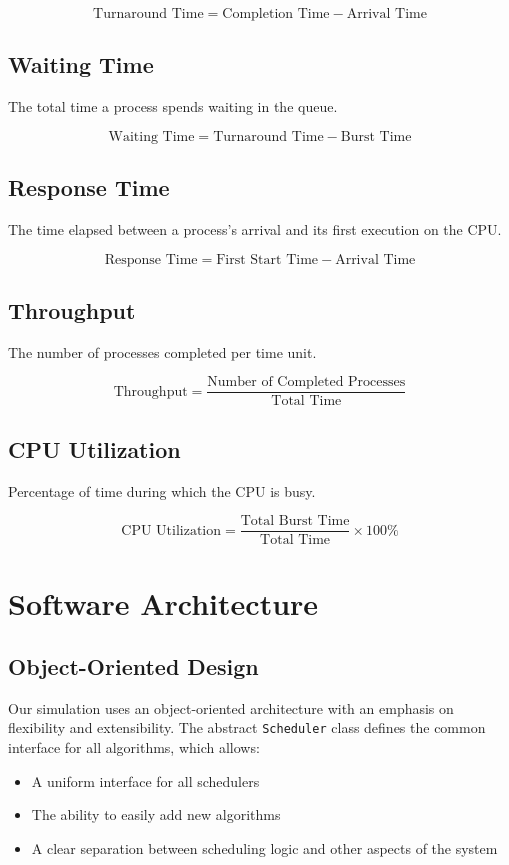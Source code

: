 \documentclass[12pt,a4paper]{article}
\begin{document}
\[ \text{Turnaround Time} = \text{Completion Time} - \text{Arrival Time} \]

\subsection{Waiting Time}
The total time a process spends waiting in the queue.

\[ \text{Waiting Time} = \text{Turnaround Time} - \text{Burst Time} \]

\subsection{Response Time}
The time elapsed between a process's arrival and its first execution on the CPU.

\[ \text{Response Time} = \text{First Start Time} - \text{Arrival Time} \]

\subsection{Throughput}
The number of processes completed per time unit.

\[ \text{Throughput} = \frac{\text{Number of Completed Processes}}{\text{Total Time}} \]

\subsection{CPU Utilization}
Percentage of time during which the CPU is busy.

\[ \text{CPU Utilization} = \frac{\text{Total Burst Time}}{\text{Total Time}} \times 100\% \]

\section{Software Architecture}
\subsection{Object-Oriented Design}
Our simulation uses an object-oriented architecture with an emphasis on flexibility and extensibility. The abstract \texttt{Scheduler} class defines the common interface for all algorithms, which allows:
\begin{itemize}
    \item A uniform interface for all schedulers
    \item The ability to easily add new algorithms
    \item A clear separation between scheduling logic and other aspects of the system
\end{itemize}
\end{document}
